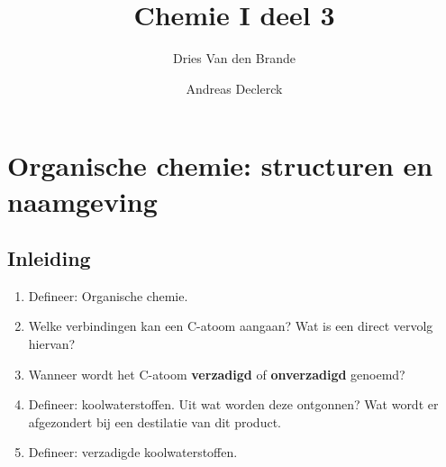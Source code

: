 \documentclass[a4paper,12pt]{article}
\begin{document}
\title{Chemie I deel 3}
    \author{Dries Van den Brande \and Andreas Declerck}

    \maketitle
    \date{}
    \setcounter{section}{11}


    \section{Organische chemie: structuren en naamgeving}
    \subsection*{Inleiding}
    \begin{enumerate}
        \item Defineer: Organische chemie.
        \item Welke verbindingen kan een C-atoom aangaan? Wat is een direct vervolg hiervan? 
        \item Wanneer wordt het C-atoom \textbf{verzadigd} of \textbf{onverzadigd} genoemd?
        \item Defineer: koolwaterstoffen. Uit wat worden deze ontgonnen? Wat wordt er afgezondert bij een destilatie van dit product.
        \item Defineer: verzadigde koolwaterstoffen.
    \end{enumerate}
\end{document}
